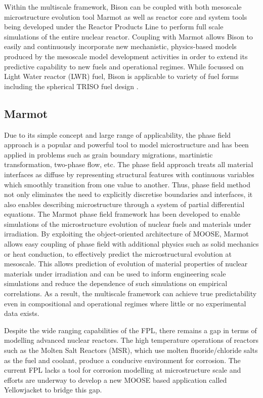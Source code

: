 	Within the multiscale framework, {Bison} can be coupled with both mesoscale microstructure evolution tool {Marmot} as well as reactor core and system tools being developed under the Reactor Products Line to perform full scale simulations of the entire nuclear reactor. Coupling with {Marmot} allows {Bison} to easily and continuously incorporate new mechanistic, physics-based models produced by the mesoscale model development activities in order to extend its predictive capability to new fuels and operational regimes. While focussed on Light Water reactor (LWR) fuel, {Bison} is applicable to variety of fuel forms including the spherical TRISO fuel design \cite{NEAMS}.

	\subsection{Marmot}
	Due to its simple concept and large range of applicability, the phase field approach is a popular and powerful tool to model microstructure and has been applied in problems such as grain boundary migrations, martinistic transformation, two-phase flow, etc. The phase field approach treats all material interfaces as diffuse by representing structural features with continuous variables which smoothly transition from one value to another. Thus, phase field method not only eliminates the need to explicitly discretise boundaries and interfaces, it also enables describing microstructure through a system of partial differential equations.  The {Marmot} phase field framework has been developed to enable simulations of the microstructure evolution of nuclear fuels and materials under irradiation. By exploiting the object-oriented architecture of {MOOSE}, {Marmot} allows easy coupling of phase field with additional physics such as solid mechanics or heat conduction, to effectively predict the microstructural evolution at mesoscale. This allows prediction of evolution of material properties of nuclear materials under irradiation and can be used to inform engineering scale simulations and reduce the dependence of such simulations on empirical correlations. As a result, the multiscale framework can achieve true predictability even in compositional and operational regimes where little or no experimental data exists.

	Despite the wide ranging capabilities of the FPL, there remains a gap in terms of modelling advanced nuclear reactors. The high temperature operations of reactors such as the Molten Salt Reactors (MSR), which use molten fluoride/chloride salts as the fuel and coolant, produce a conducive environment for corrosion. The current FPL lacks a tool for corrosion modelling at microstructure scale and efforts are underway to develop a new {MOOSE} based application called {Yellowjacket} to bridge this gap.


